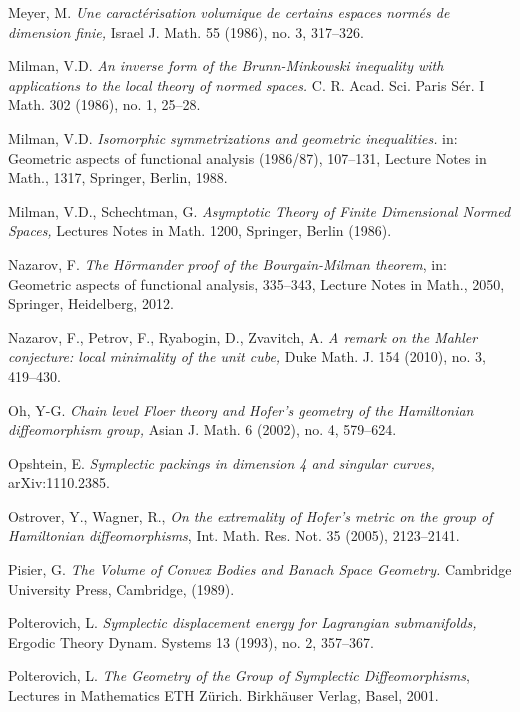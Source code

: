\documentclass{icmart}
\theoremstyle{definition}
\begin{document}
\begin{thebibliography}{7}
 Meyer, M. {\it Une caract\'erisation volumique de certains espaces
norm\'es de dimension finie,} Israel J. Math. 55 (1986), no. 3,
317--326.

 Milman, V.D. {\it An inverse form of the Brunn-Minkowski inequality with applications to the local theory of normed spaces.}
C. R. Acad. Sci. Paris S\'er. I Math. 302 (1986), no. 1, 25--28.

  Milman, V.D. {\it Isomorphic symmetrizations and geometric
inequalities.} in: Geometric aspects of functional analysis (1986/87),
107--131, Lecture Notes in Math., 1317, Springer, Berlin, 1988.

  Milman, V.D., Schechtman, G. {\it Asymptotic Theory of Finite Dimensional Normed Spaces,} 
Lectures Notes in Math. 1200, Springer, Berlin (1986).

 Nazarov, F. {\it The H\"{o}rmander proof of the Bourgain-Milman theorem}, in: Geometric aspects of functional analysis, 335--343, 
Lecture Notes in Math., 2050, Springer, Heidelberg, 2012. 

 Nazarov, F., Petrov, F., Ryabogin, D., Zvavitch,
A. {\it A remark on the Mahler conjecture: local minimality of the unit cube,} Duke Math. J. 154 (2010), no. 3, 419--430. 

 Oh, Y-G. {\it Chain level Floer theory and Hofer's geometry of the Hamiltonian diffeomorphism
group,} Asian J. Math. 6 (2002), no. 4, 579--624.


 Opshtein, E. {\it Symplectic packings in dimension 4 and singular curves, } arXiv:1110.2385.

 Ostrover, Y., Wagner, R., {\it On the extremality of Hofer's metric on the group
of Hamiltonian diffeomorphisms}, Int. Math. Res. Not. 35 (2005), 2123--2141. 

 Pisier, G. {\it The Volume of Convex Bodies and Banach Space
Geometry.} Cambridge University Press, Cambridge, (1989).

 Polterovich, L. {\it Symplectic displacement energy for Lagrangian submanifolds,} 
Ergodic Theory Dynam. Systems 13 (1993), no. 2, 357--367.

 Polterovich, L. {\it The Geometry of the Group of Symplectic Diffeomorphisms},
Lectures in Mathematics ETH Z\"{u}rich. Birkh\"{a}user Verlag,
Basel, 2001.




\end{thebibliography}
\end{document}

